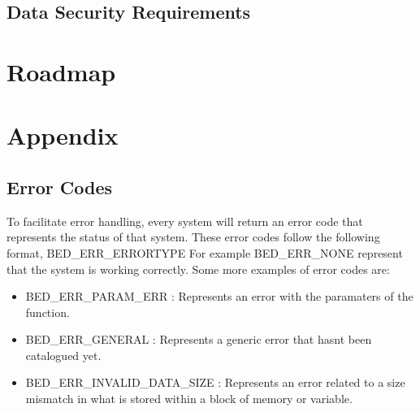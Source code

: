\documentclass{article}
\begin{document}
\subsection{Data Security Requirements }










\section{Roadmap}


\section{Appendix}
\subsection{Error Codes}
To facilitate error handling, every system will return an error code that represents the status of that system. These error codes follow the following format, BED\_ERR\_ERRORTYPE
For example BED\_ERR\_NONE represent that the system is working correctly. Some more examples of error codes are:
\begin{itemize}
\item BED\_ERR\_PARAM\_ERR		 	: Represents an error with the paramaters of the function.
\item BED\_ERR\_GENERAL			 	: Represents a generic error that hasnt been catalogued yet. 	
\item BED\_ERR\_INVALID\_DATA\_SIZE	: Represents an error related to a size mismatch in what is stored within a block of memory or variable.
\end{itemize}
































\end{document}

